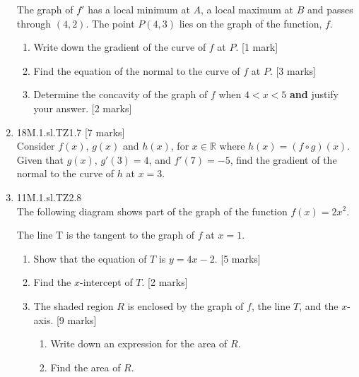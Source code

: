 \documentclass[12pt, twoside]{article}
\begin{document}
\begin{enumerate}
    The graph of $f'$ has a local minimum at $A$, a local maximum at $B$ and passes through $(4,2)$. The point $P(4,3)$ lies on the graph of the function, $f$.
    \begin{enumerate}
      \item Write down the gradient of the curve of $f$ at $P$. [1 mark]
      \item Find the equation of the normal to the curve of $f$ at $P$. [3 marks]
      \item Determine the concavity of the graph of $f$ when $4<x<5$ \textbf{and} justify your answer. [2 marks]
    \end{enumerate}

  \item 18M.1.sl.TZ1.7 [7 marks]\\
  Consider $f(x)$, $g(x)$ and $h(x)$, for $x \in \mathbb{R}$ where $h(x)=(f \circ g)(x)$.\\
  Given that $g(x)$, $g'(3)=4$, and $f'(7)=-5$, find the gradient of the normal to the curve of $h$ at $x=3$.


  \item 11M.1.sl.TZ2.8\\
  The following diagram shows part of the graph of the function $f(x)=2x^2$.
    \begin{center}
    \end{center}

    The line T is the tangent to the graph of $f$ at $x=1$.
    \begin{enumerate}
      \item Show that the equation of $T$ is $y=4x-2$. [5 marks]
      \item Find the $x$-intercept of $T$. [2 marks]
      \item The shaded region $R$ is enclosed by the graph of $f$, the line $T$, and the $x$-axis. [9 marks]
      \begin{enumerate}
        \item Write down an expression for the area of $R$.
        \item Find the area of $R$.
      \end{enumerate}
    \end{enumerate}



\end{enumerate}
\end{document}
